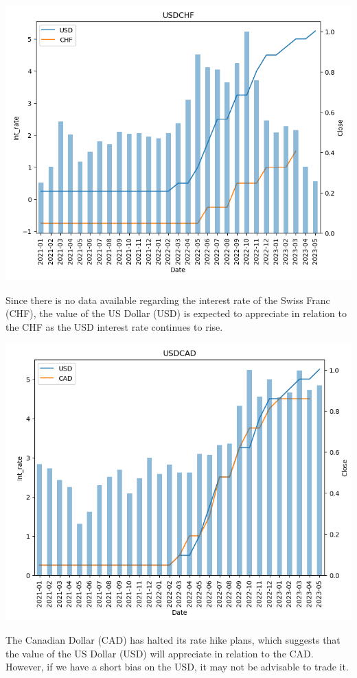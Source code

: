 \documentclass{article}
\begin{document}
\begin{center}
   \includegraphics[scale=0.8]{p16.png}    
\end{center}
Since there is no data available regarding the interest rate of the Swiss Franc (CHF), the value of the US Dollar (USD) is expected to appreciate in relation to the CHF as the USD interest rate continues to rise.
\begin{center}
   \includegraphics[scale=0.8]{p17.png}    
\end{center}
The Canadian Dollar (CAD) has halted its rate hike plans, which suggests that the value of the US Dollar (USD) will appreciate in relation to the CAD. However, if we have a short bias on the USD, it may not be advisable to trade it.
\end{document}
